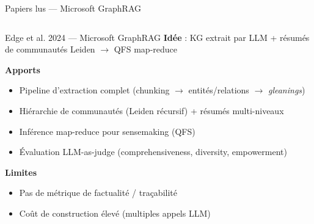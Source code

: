 \documentclass[aspectratio=169,10pt]{beamer}
\begin{document}
\begin{frame}{Papiers lus --- Microsoft GraphRAG}
  \begin{columns}
    \begin{block}{\small Edge et al. 2024 --- Microsoft GraphRAG}
    \footnotesize
    \textbf{Idée} : KG extrait par LLM + résumés de communautés Leiden $\rightarrow$ QFS map-reduce

    \vspace{0.3em}
    \textbf{Apports}
    \begin{itemize}\setlength\itemsep{-0.1em}
      \item Pipeline d'extraction complet (chunking $\rightarrow$ entités/relations $\rightarrow$ \textit{gleanings})
      \item Hiérarchie de communautés (Leiden récursif) + résumés multi-niveaux
      \item Inférence map-reduce pour sensemaking (QFS)
      \item Évaluation LLM-as-judge (comprehensiveness, diversity, empowerment)
    \end{itemize}
    \textbf{Limites}
    \begin{itemize}\setlength\itemsep{-0.1em}
      \item Pas de métrique de factualité / traçabilité
      \item Coût de construction élevé (multiples appels LLM)
    \end{itemize}
    \end{block}
  \end{columns}
\end{frame}
\end{document}
